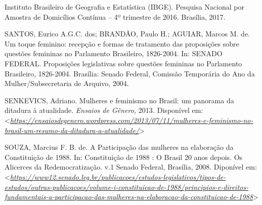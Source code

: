 Instituto Brasileiro de Geografia e Estatística (IBGE). Pesquisa
Nacional por Amostra de Domicílios Contínua -- 4º trimestre de 2016.
Brasília, 2017.

SANTOS, Eurico A.G.C. dos; BRANDÃO, Paulo H.; AGUIAR, Marcos M. de. Um
toque feminino: recepção e formas de tratamento das proposições sobre
questões femininas no Parlamento Brasileiro, 1826-2004. In: SENADO
FEDERAL. Proposições legislativas sobre questões femininas no Parlamento
Brasileiro, 1826-2004. Brasília: Senado Federal, Comissão Temporária do
Ano da Mulher/Subsecretaria de Arquivo, 2004.

SENKEVICS, Adriano. Mulheres e feminismo no Brasil: um panorama da
ditadura à atualidade. \emph{Ensaios de Gênero,} 2013\emph{.} Disponível
em:
\textless{}\href{https://ensaiosdegenero.wordpress.com/2013/07/11/mulheres-e-feminismo-no-brasil-um-resumo-da-ditadura-a-atualidade/}{\emph{https://ensaiosdegenero.wordpress.com/2013/07/11/mulheres-e-feminismo-no-brasil-um-resumo-da-ditadura-a-atualidade/}}\textgreater{}

SOUZA, Marcius F. B. de. A Participação das mulheres na elaboração da
Constituição de 1988. In: Constituição de 1988 : O Brasil 20 anos
depois. Os Alicerces da Redemocratização. v.1 Senado Federal, Brasília,
2008. Diponível em:
\textless{}\href{https://www12.senado.leg.br/publicacoes/estudos-legislativos/tipos-de-estudos/outras-publicacoes/volume-i-constituicao-de-1988/principios-e-direitos-fundamentais-a-participacao-das-mulheres-na-elaboracao-da-constituicao-de-1988}{\emph{https://www12.senado.leg.br/publicacoes/estudos-legislativos/tipos-de-estudos/outras-publicacoes/volume-i-constituicao-de-1988/principios-e-direitos-fundamentais-a-participacao-das-mulheres-na-elaboracao-da-constituicao-de-1988}}\textgreater{}
